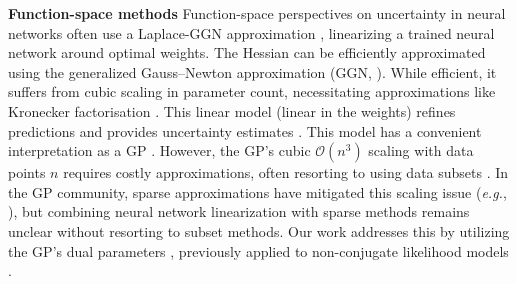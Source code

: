 \documentclass{article}
\makeatletter
\newcommand{\eg}{\textit{e.g.\@}\xspace}
\makeatother
\begin{document}
\textbf{Function-space methods}
Function-space perspectives on uncertainty in neural networks often use a Laplace-GGN approximation \citep{daxberger2021laplace}, linearizing a trained neural network around optimal weights. The Hessian can be efficiently approximated using the generalized Gauss--Newton approximation (GGN, \cite{botev2017practical}). While efficient, it suffers from cubic scaling in parameter count, necessitating approximations like Kronecker factorisation \cite{martens2015optimizing, ritter2018kfac}. This linear model (linear in the weights) refines predictions and provides uncertainty estimates \citep{immer2021scalable}. This model has a convenient interpretation as a GP \cite{immer2021scalable, khan2019approximate, maddox2021fast}.
%
However, the GP's cubic $\mathcal{O}(n^3)$ scaling with data points $n$ requires costly approximations, often resorting to using data subsets \cite{immer2021scalable}. In the GP community, sparse approximations have mitigated this scaling issue (\eg, \cite{titsias2009variational,hensman2013gaussian}), but combining neural network linearization with sparse methods remains unclear without resorting to subset methods. Our work addresses this by utilizing the GP's dual parameters \cite{csato2002sparse}, previously applied to non-conjugate likelihood models \cite{adam2021dual}.

%
\end{document}

